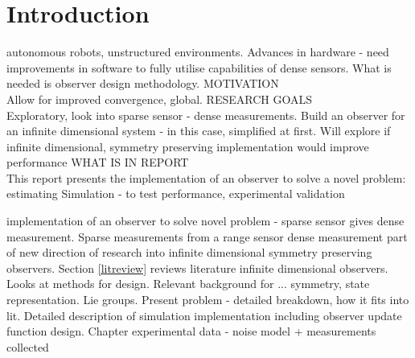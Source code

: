 \chapter{Introduction}

autonomous robots, unstructured environments. Advances in hardware - need improvements in software to fully utilise capabilities of dense sensors.
	What is needed is observer design methodology.
MOTIVATION\\
	Allow for improved convergence, global. 
RESEARCH     GOALS\\
	Exploratory, look into sparse sensor - dense measurements. Build an observer for an infinite dimensional system - in this case, simplified at first. Will explore if infinite dimensional, symmetry preserving implementation would improve performance
WHAT IS IN REPORT\\
	This report presents the implementation of an observer to solve a novel problem: estimating
	Simulation - to test performance, experimental validation
	
	implementation of an observer to solve novel problem - sparse sensor gives dense measurement.
	Sparse measurements from a range sensor
	dense measurement part of new direction of research into infinite dimensional symmetry preserving observers.
	Section \ref{litreview} reviews literature infinite dimensional observers. Looks at methods for design.
	Relevant background for ... symmetry, state representation. Lie groups. 
	Present problem - detailed breakdown, how it fits into lit. 
	Detailed description of simulation implementation including observer update function design.
	Chapter 
	experimental data - noise model + measurements collected

